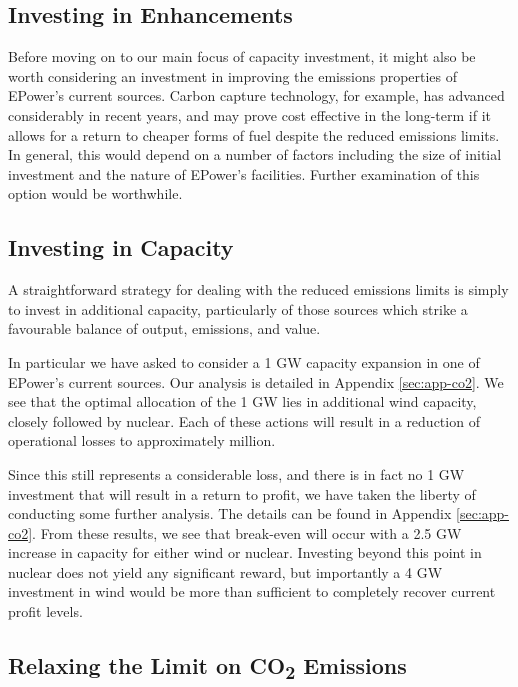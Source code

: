 \documentclass[twocolumn]{article}
\begin{document}
    
    \subsection{Investing in Enhancements}
    
    Before moving on to our main focus of capacity investment, it might also be worth considering an investment in improving the emissions properties of EPower's current sources.  Carbon capture technology, for example, has advanced considerably in recent years, and may prove cost effective in the long-term if it allows for a return to cheaper forms of fuel despite the reduced emissions limits.  In general, this would depend on a number of factors including the size of initial investment and the nature of EPower's facilities.  Further examination of this option would be worthwhile.
    
    
    \subsection{Investing in Capacity}
    
    A straightforward strategy for dealing with the reduced emissions limits is simply to invest in additional capacity, particularly of those sources which strike a favourable balance of output, emissions, and value.
    
    In particular we have asked to consider a 1 GW capacity expansion in one of EPower's current sources.  Our analysis is detailed in Appendix \ref{sec:app-co2}.  We see that the optimal allocation of the 1 GW lies in additional wind capacity, closely followed by nuclear.  Each of these actions will result in a reduction of operational losses to approximately  million. 
    
    Since this still represents a considerable loss, and there is in fact no 1 GW investment that will result in a return to profit, we have taken the liberty of conducting some further analysis.  The details can be found in Appendix \ref{sec:app-co2}.  From these results, we see that break-even will occur with a 2.5 GW increase in capacity for either wind or nuclear.  Investing beyond this point in nuclear does not yield any significant reward, but importantly a 4 GW investment in wind would be more than sufficient to completely recover current profit levels.

    
    \subsection{Relaxing the Limit on CO\textsubscript{2} Emissions}
    
\end{document}
